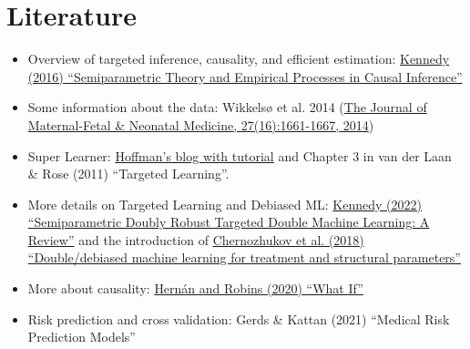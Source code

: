 \documentclass[a4paper,danish]{article}
\begin{document}
\section{Literature}
\label{sec:orge41a013}
\begin{itemize}
\item Overview of targeted inference, causality, and efficient estimation: \href{https://arxiv.org/abs/1510.04740}{Kennedy (2016)
``Semiparametric Theory and Empirical Processes in Causal Inference''}
\item Some information about the data: Wikkelsø et al. 2014 (\href{https://www.tandfonline.com/doi/full/10.3109/14767058.2013.872095}{The Journal of Maternal-Fetal \& Neonatal
Medicine, 27(16):1661-1667, 2014})
\item Super Learner: \href{https://www.khstats.com/blog/sl/superlearning/}{Hoffman's blog with tutorial} and Chapter 3 in van der Laan \& Rose (2011) ``Targeted
Learning''.
\item More details on Targeted Learning and Debiased ML: \href{https://arxiv.org/abs/2203.06469}{Kennedy (2022) ``Semiparametric Doubly Robust
Targeted Double Machine Learning: A Review''} and the introduction of \href{https://academic.oup.com/ectj/article/21/1/C1/5056401}{Chernozhukov et al. (2018)
``Double/debiased machine learning for treatment and structural parameters''}
\item More about causality: \href{https://www.hsph.harvard.edu/miguel-hernan/causal-inference-book/}{Hernán and Robins (2020) ``What If''}
\item Risk prediction and cross validation: Gerds \& Kattan (2021) ``Medical Risk Prediction Models''
\end{itemize}
\end{document}

